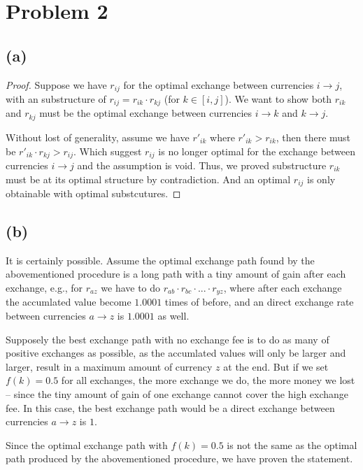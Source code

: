 \documentclass[11pt]{article}
\begin{document}
\section{Problem 2}

\subsection{(a)}
\begin{proof}
Suppose we have $r_{ij}$ for the optimal exchange between currencies $i \to j$, with an substructure of $r_{ij} = r_{ik} \cdot r_{kj}$ (for $k \in [i,j]$). We want to show both $r_{ik}$ and $r_{kj}$ must be the optimal exchange between currencies $i \to k$ and $k \to j$.

Without lost of generality, assume we have $r'_{ik}$ where $r'_{ik} > r_{ik}$, then there must be $r'_{ik} \cdot r_{kj} > r_{ij}$. Which suggest $r_{ij}$ is no longer optimal for the exchange between currencies $i \to j$ and the assumption is void. Thus, we proved substructure $r_{ik}$ must be at its optimal structure by contradiction. And an optimal $r_{ij}$ is only obtainable with optimal substcutures.
\end{proof}

\subsection{(b)}

It is certainly possible. Assume the optimal exchange path found by the abovementioned procedure is a long path with a tiny amount of gain after each exchange, e.g., for $r_{az}$ we have to do $ r_{ab} \cdot r_{bc} \cdot ... \cdot r_{yz}$, where after each exchange the accumlated value become $1.0001$ times of before, and an direct exchange rate between currencies $a \to z$ is $1.0001$ as well.

Supposely the best exchange path with no exchange fee is to do as many of positive exchanges as possible, as the accumlated values will only be larger and larger, result in a maximum amount of currency $z$ at the end. But if we set $f(k) = 0.5$ for all exchanges, the more exchange we do, the more money we lost -- since the tiny amount of gain of one exchange cannot cover the high exchange fee. In this case, the best exchange path would be a direct exchange between currencies $a \to z$ is $1$.

Since the optimal exchange path with $f(k) = 0.5$ is not the same as the optimal path produced by the abovementioned procedure, we have proven the statement.

%
% 
% 
\end{document}
